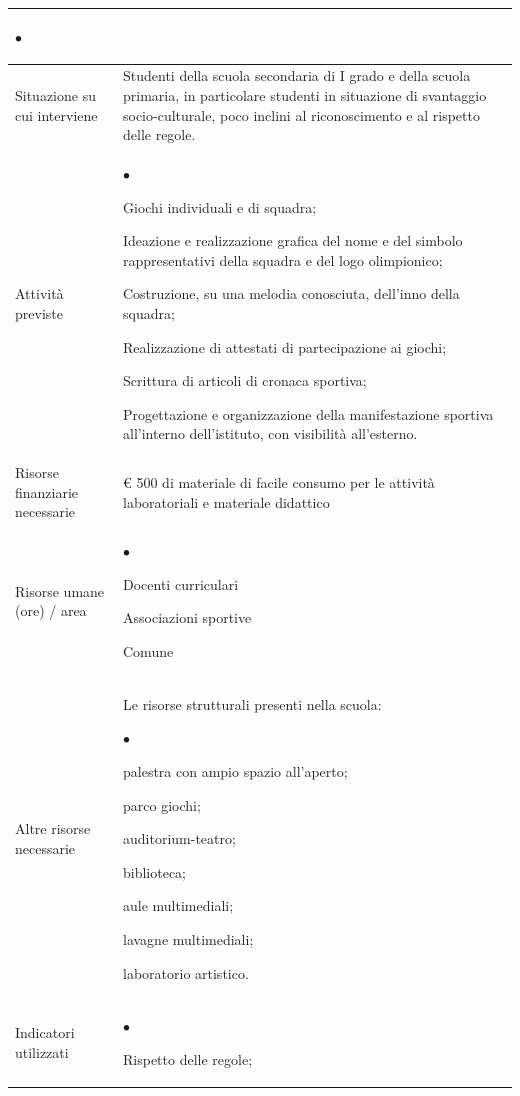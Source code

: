 \documentclass[12pt,a4paper,oneside]{memoir}
\newenvironment{elenco}{\begin{list}{$\bullet$}{%
              \setlength{\leftmargin}{4mm}%
              \setlength{\rightmargin}{1mm}%
               \setlength{\itemindent}{0mm}%
               \setlength{\labelwidth}{2mm}%
               \setlength{\labelsep}{2mm}%
              \setlength{\itemsep}{-\parsep}%
              \setlength{\partopsep}{0pt}%
              \setlength{\topsep}{0pt}%
             \setlength{\parskip}{0pt}%
              }}{\end{list}}
\begin{document}
\begin{footnotesize}
\begin{longtable}{|>{\raggedright}p{2.5cm}|>{\raggedright\arraybackslash}P{10cm}|}
\begin{elenco}
\end{elenco}\\[-4mm] \hline
Situazione su cui interviene&Studenti della scuola secondaria di I grado e della scuola primaria, in particolare studenti in situazione di svantaggio socio-culturale, poco inclini al riconoscimento e al rispetto delle regole.\\ \hline
Attività previste&
\begin{elenco}
\item Giochi individuali e di squadra;
\item Ideazione e realizzazione grafica del nome e del simbolo rappresentativi della squadra e del logo olimpionico;
\item Costruzione, su una melodia conosciuta, dell'inno della squadra;
\item Realizzazione di attestati di partecipazione ai giochi;
\item Scrittura di articoli di cronaca sportiva;
\item Progettazione e organizzazione della manifestazione sportiva all'interno dell'istituto, con visibilità all'esterno.
\end{elenco}\\[-4mm] \hline
Risorse finanziarie necessarie&€ 500 di materiale di facile consumo per le attività laboratoriali e materiale didattico\\ \hline
Risorse umane (ore) / area&
\begin{elenco}
\item Docenti curriculari
\item Associazioni sportive
\item Comune
\end{elenco}\\ \hline
Altre risorse necessarie&Le risorse strutturali presenti nella scuola:
\begin{elenco}
\item palestra con ampio spazio all'aperto;
\item parco giochi;
\item auditorium-teatro;
\item biblioteca;
\item aule multimediali;
\item lavagne multimediali;
\item laboratorio artistico.
\end{elenco}\\[-4mm] \hline
Indicatori utilizzati&
\begin{elenco}
\item Rispetto delle regole;

\end{elenco}
\end{longtable}
\end{footnotesize}
\end{document}
